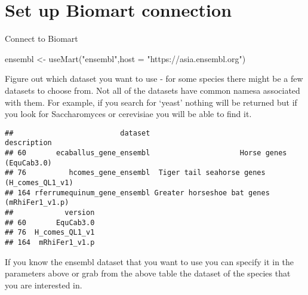 \documentclass[
]{book}
\newenvironment{Shaded}{\begin{snugshade}}{\end{snugshade}}
\newcommand{\AttributeTok}[1]{\textcolor[rgb]{0.77,0.63,0.00}{#1}}
\newcommand{\CommentTok}[1]{\textcolor[rgb]{0.56,0.35,0.01}{\textit{#1}}}
\newcommand{\ConstantTok}[1]{\textcolor[rgb]{0.00,0.00,0.00}{#1}}
\newcommand{\FunctionTok}[1]{\textcolor[rgb]{0.00,0.00,0.00}{#1}}
\newcommand{\NormalTok}[1]{#1}
\newcommand{\OtherTok}[1]{\textcolor[rgb]{0.56,0.35,0.01}{#1}}
\newcommand{\SpecialCharTok}[1]{\textcolor[rgb]{0.00,0.00,0.00}{#1}}
\newcommand{\StringTok}[1]{\textcolor[rgb]{0.31,0.60,0.02}{#1}}
\begin{document}
\hypertarget{set-up-biomart-connection}{%
\section{Set up Biomart connection}\label{set-up-biomart-connection}}

Connect to Biomart

\begin{Shaded}
\begin{Highlighting}[]
\NormalTok{ensembl }\OtherTok{\textless{}{-}} \FunctionTok{useMart}\NormalTok{(}\StringTok{"ensembl"}\NormalTok{,}\AttributeTok{host =} \StringTok{"https://asia.ensembl.org"}\NormalTok{)}
\end{Highlighting}
\end{Shaded}

Figure out which dataset you want to use - for some species there might be a few datasets to choose from. Not all of the datasets have common namesa associated with them. For example, if you search for `yeast' nothing will be returned but if you look for Saccharomyces or cerevisiae you will be able to find it.

\begin{Shaded}
\end{Shaded}

\begin{verbatim}
##                         dataset                                 description
## 60       ecaballus_gene_ensembl                     Horse genes (EquCab3.0)
## 76          hcomes_gene_ensembl  Tiger tail seahorse genes (H_comes_QL1_v1)
## 164 rferrumequinum_gene_ensembl Greater horseshoe bat genes (mRhiFer1_v1.p)
##            version
## 60       EquCab3.0
## 76  H_comes_QL1_v1
## 164  mRhiFer1_v1.p
\end{verbatim}

If you know the ensembl dataset that you want to use you can specify it in the parameters above or grab from the above table the dataset of the species that you are interested in.
\end{document}
